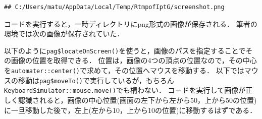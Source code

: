 \documentclass[
]{article}
\newenvironment{Shaded}{\begin{snugshade}}{\end{snugshade}}
\newcommand{\AttributeTok}[1]{\textcolor[rgb]{0.77,0.63,0.00}{#1}}
\newcommand{\CommentTok}[1]{\textcolor[rgb]{0.56,0.35,0.01}{\textit{#1}}}
\newcommand{\DecValTok}[1]{\textcolor[rgb]{0.00,0.00,0.81}{#1}}
\newcommand{\FunctionTok}[1]{\textcolor[rgb]{0.00,0.00,0.00}{#1}}
\newcommand{\NormalTok}[1]{#1}
\newcommand{\OtherTok}[1]{\textcolor[rgb]{0.56,0.35,0.01}{#1}}
\newcommand{\SpecialCharTok}[1]{\textcolor[rgb]{0.00,0.00,0.00}{#1}}
\newcommand{\StringTok}[1]{\textcolor[rgb]{0.31,0.60,0.02}{#1}}
\begin{document}
\begin{Shaded}
\end{Shaded}

\begin{verbatim}
## C:/Users/matu/AppData/Local/Temp/RtmpofIptG/screenshot.png
\end{verbatim}

コードを実行すると，一時ディレクトリにpng形式の画像が保存される．
筆者の環境では次の画像が保存されていた．

以下のように\texttt{pag\$locateOnScreen()}を使うと，画像のパスを指定することでその画像の位置を取得できる．
位置は，画像の4つの頂点の位置なので，その中心を\texttt{automater::center()}で求めて，その位置へマウスを移動する．
以下ではマウスの移動は\texttt{pag\$moveTo()}で実行しているが，もちろん\texttt{KeyboardSimulator::mouse.move()}でも構わない．
コードを実行して画像が正しく認識されると，画像の中心位置(画面の左下から左から50，上から50の位置)に一旦移動した後で，左上(左から10，上から10の位置)に移動するはずである．

\begin{Shaded}
\end{Shaded}
\end{document}
